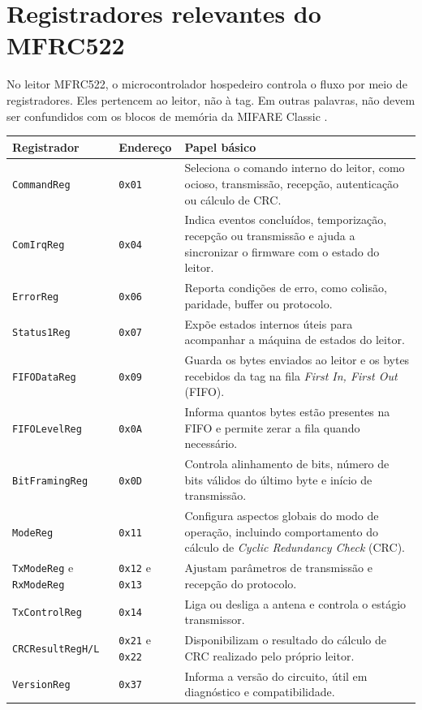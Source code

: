 \section{Registradores relevantes do MFRC522}
No leitor MFRC522, o microcontrolador hospedeiro controla o fluxo por meio de registradores. Eles pertencem ao leitor, não à tag. Em outras palavras, não devem ser confundidos com os blocos de memória da MIFARE Classic \citep{nxp_mfrc522}.

\begin{center}
\small
\begin{tabular}{|p{3.0cm}|p{2.0cm}|p{8.3cm}|}
\hline
\textbf{Registrador} & \textbf{Endereço} & \textbf{Papel básico} \\
\hline
\texttt{CommandReg} & \texttt{0x01} & Seleciona o comando interno do leitor, como ocioso, transmissão, recepção, autenticação ou cálculo de CRC. \\
\hline
\texttt{ComIrqReg} & \texttt{0x04} & Indica eventos concluídos, temporização, recepção ou transmissão e ajuda a sincronizar o firmware com o estado do leitor. \\
\hline
\texttt{ErrorReg} & \texttt{0x06} & Reporta condições de erro, como colisão, paridade, buffer ou protocolo. \\
\hline
\texttt{Status1Reg} & \texttt{0x07} & Expõe estados internos úteis para acompanhar a máquina de estados do leitor. \\
\hline
\texttt{FIFODataReg} & \texttt{0x09} & Guarda os bytes enviados ao leitor e os bytes recebidos da tag na fila \textit{First In, First Out} (FIFO). \\
\hline
\texttt{FIFOLevelReg} & \texttt{0x0A} & Informa quantos bytes estão presentes na FIFO e permite zerar a fila quando necessário. \\
\hline
\texttt{BitFramingReg} & \texttt{0x0D} & Controla alinhamento de bits, número de bits válidos do último byte e início de transmissão. \\
\hline
\texttt{ModeReg} & \texttt{0x11} & Configura aspectos globais do modo de operação, incluindo comportamento do cálculo de \textit{Cyclic Redundancy Check} (CRC). \\
\hline
\texttt{TxModeReg} e \texttt{RxModeReg} & \texttt{0x12} e \texttt{0x13} & Ajustam parâmetros de transmissão e recepção do protocolo. \\
\hline
\texttt{TxControlReg} & \texttt{0x14} & Liga ou desliga a antena e controla o estágio transmissor. \\
\hline
\texttt{CRCResultRegH/L} & \texttt{0x21} e \texttt{0x22} & Disponibilizam o resultado do cálculo de CRC realizado pelo próprio leitor. \\
\hline
\texttt{VersionReg} & \texttt{0x37} & Informa a versão do circuito, útil em diagnóstico e compatibilidade. \\
\hline
\end{tabular}
\end{center}


